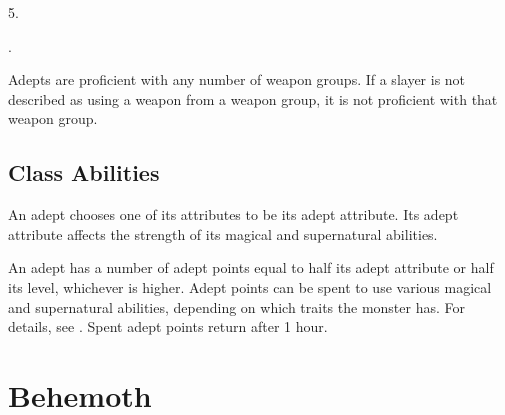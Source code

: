          5.

         .

        Adepts are proficient with any number of weapon groups.
        If a slayer is not described as using a weapon from a weapon group, it is not proficient with that weapon group.

    \subsection{Class Abilities}

         An adept chooses one of its attributes to be its adept attribute.
        Its adept attribute affects the strength of its magical and supernatural abilities.

         An adept has a number of adept points equal to half its adept attribute or half its level, whichever is higher.
        Adept points can be spent to use various magical and supernatural abilities, depending on which traits the monster has.
        For details, see .
        Spent adept points return after 1 hour.

\section{Behemoth}\label{Behemoth}

